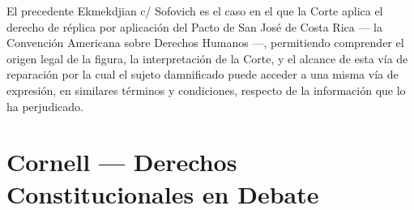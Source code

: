 \documentclass[12pt,oneside]{book}
\begin{document}
El precedente Ekmekdjian c/ Sofovich es el caso en el que la Corte aplica el derecho de réplica por aplicación del Pacto de San José de Costa Rica --- la Convención Americana sobre Derechos Humanos ---, permitiendo comprender el origen legal de la figura, la interpretación de la Corte, y el alcance de esta vía de reparación por la cual el sujeto damnificado puede acceder a una misma vía de expresión, en similares términos y condiciones, respecto de la información que lo ha perjudicado.

\section*{Cornell --- Derechos Constitucionales en Debate}
\end{document}
